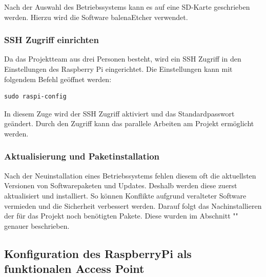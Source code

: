 \documentclass[a4paper,11pt,singlespacing]{article}
\begin{document}
        	Nach der Auswahl des Betriebssystems kann es auf eine SD-Karte geschrieben werden.
        	Hierzu wird die Software balenaEtcher verwendet.   
    	
    	\subsubsection{SSH Zugriff einrichten}
        	Da das Projektteam aus drei Personen besteht, wird ein SSH Zugriff in den Einstellungen des Raspberry Pi eingerichtet. Die Einstellungen kann mit folgendem Befehl geöffnet werden: \\
        \begin{lstlisting}
sudo raspi-config
        \end{lstlisting} 
    	
        In diesem Zuge wird der SSH Zugriff aktiviert und das Standardpasswort geändert. Durch den  Zugriff kann das parallele Arbeiten am Projekt ermöglicht werden. 
    	
    	\subsubsection{Aktualisierung und Paketinstallation}
        	Nach der Neuinstallation eines Betriebssystems fehlen diesem oft die aktuellsten Versionen von Softwarepaketen und Updates. Deshalb werden diese zuerst aktualisiert und installiert. So können Konflikte aufgrund veralteter Software vermieden und die Sicherheit verbessert werden.  
        	Darauf folgt das Nachinstallieren der für das Projekt noch benötigten Pakete. Diese wurden im Abschnitt "" genauer beschrieben. 
    	
    	
    
    	\subsection{Konfiguration des RaspberryPi als funktionalen Access Point}
\end{document}
